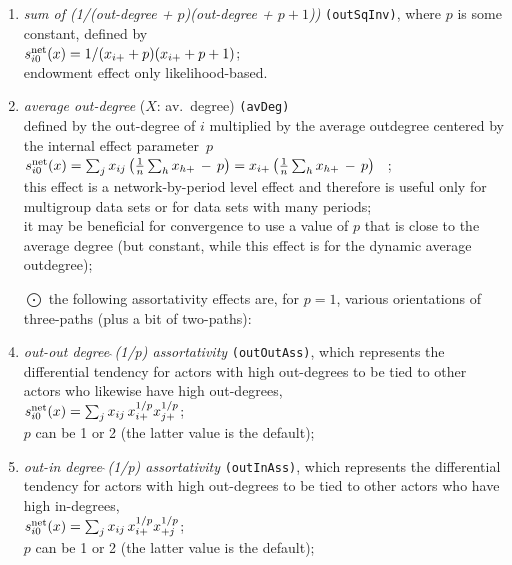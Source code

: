 \documentclass[a4paper,fleqn,11pt]{article}
\newcommand{\+}{\, + \,}
\newcommand{\vit}{\theenumi}
\begin{document}
\begin{enumerate}
 \item {\em sum of (1/(out-degree + $p$)(out-degree + $p+1$))} \texttt{(outSqInv)},
 where $p$ is some constant, defined by  \\
 $s^{\rm net}_{i\vit}(x) = 1/(x_{i+} + p)(x_{i+} + p + 1)$;\\
 endowment effect only likelihood-based.

 \item {\em average out-degree} ($X$: av.\ degree) \texttt{(avDeg)}\\
 defined by the out-degree of $i$ multiplied by the
 average outdegree centered by the internal effect parameter~$p$\\[0.2em]
 $s^{\rm net}_{i\vit}(x) =  \sum_j x_{ij}\, \big( \frac 1n \sum_h  {x_{h+}} \,-\, p \big)=
                           x_{i+}\, \big( \frac 1n \sum_h x_{h+} \,-\, p \big) $ \, ;\\[0.2em]
  this effect is a network-by-period level effect and therefore is useful only
  for multigroup data sets or for data sets with many periods;\\
  it may be beneficial for convergence to use a value of $p$ that is
  close to the average degree (but constant, while this effect
  is for the dynamic average outdegree);

 \item[{\hspace*{-1ex}$\bigodot$}] the following assortativity effects are,
 for $p=1$, various orientations of three-paths (plus a bit of two-paths):\\

 \item {\em out-out degree$\,\hat{\ }$(1/p) assortativity}
 \texttt{(outOutAss)},
 which represents the differential tendency for actors with high out-degrees
 to be tied to other actors who likewise have high out-degrees,\\
 $s^{\rm net}_{i\vit}(x) = \sum_j x_{ij}\, {x_{i+}^{1/p}} {x_{j+}^{1/p}} $;\\
 $p$ can be 1 or 2 (the latter value is the default);

 \item {\em out-in degree$\,\hat{\ }$(1/p) assortativity}
 \texttt{(outInAss)},
 which represents the differential tendency for actors with high out-degrees
 to be tied to other actors who have high in-degrees,\\
 $s^{\rm net}_{i\vit}(x) = \sum_j x_{ij}\, {x_{i+}^{1/p}} {x_{+j}^{1/p}} $;\\
 $p$ can be 1 or 2 (the latter value is the default);


\end{enumerate}
\end{document}
